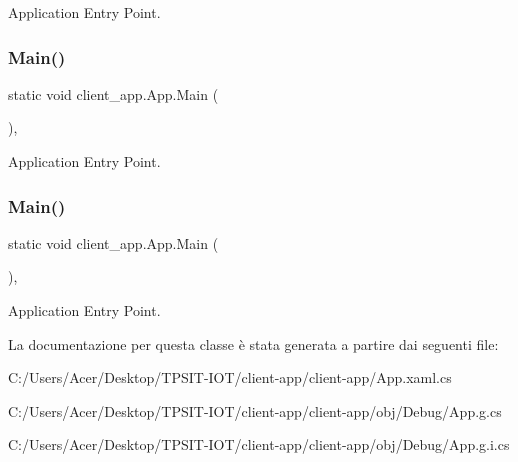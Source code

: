 Application Entry Point. 

\mbox{\label{classclient__app_1_1_app_a417dbddda5b9e88a0222c83bce99b95b}} 
\subsubsection{\texorpdfstring{Main()}{Main()}\hspace{0.1cm}{\footnotesize\ttfamily [3/4]}}
{\footnotesize\ttfamily static void client\+\_\+app.\+App.\+Main (\begin{DoxyParamCaption}{ }\end{DoxyParamCaption})\hspace{0.3cm}{\ttfamily [inline]}, {\ttfamily [static]}}



Application Entry Point. 

\mbox{\label{classclient__app_1_1_app_a417dbddda5b9e88a0222c83bce99b95b}} 
\subsubsection{\texorpdfstring{Main()}{Main()}\hspace{0.1cm}{\footnotesize\ttfamily [4/4]}}
{\footnotesize\ttfamily static void client\+\_\+app.\+App.\+Main (\begin{DoxyParamCaption}{ }\end{DoxyParamCaption})\hspace{0.3cm}{\ttfamily [inline]}, {\ttfamily [static]}}



Application Entry Point. 



La documentazione per questa classe è stata generata a partire dai seguenti file\+:\begin{DoxyCompactItemize}
\item 
C\+:/\+Users/\+Acer/\+Desktop/\+T\+P\+S\+I\+T-\/\+I\+O\+T/client-\/app/client-\/app/App.\+xaml.\+cs\item 
C\+:/\+Users/\+Acer/\+Desktop/\+T\+P\+S\+I\+T-\/\+I\+O\+T/client-\/app/client-\/app/obj/\+Debug/App.\+g.\+cs\item 
C\+:/\+Users/\+Acer/\+Desktop/\+T\+P\+S\+I\+T-\/\+I\+O\+T/client-\/app/client-\/app/obj/\+Debug/App.\+g.\+i.\+cs\end{DoxyCompactItemize}
